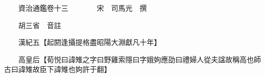 










 


 
 


 

  
  
  
  
  





  
  
  
  
  
 
  

  

  
  
  



  

 
 

  
   




  

  
  


  　　資治通鑑卷十三　　　　宋　司馬光　撰

　　胡三省　音註

　　漢紀五【起閼逢攝提格盡昭陽大淵獻凡十年】

　　高皇后【荀悦曰諱雉之字曰野雞索隱曰字娥姁應劭曰禮婦人從夫諡故稱高也師古曰諱雉故臣下諱雉也姁許于翻】

